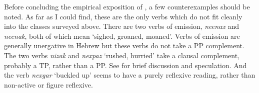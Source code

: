 \begin{exe}
\begin{xlist}
\begin{xlist}
\begin{exe}
\begin{xlist}
\begin{xlist}
\begin{exe}
\begin{xlist}
\begin{xlist}
\begin{exe}
\begin{exe}
\begin{xlist}
\begin{exe}
\begin{exe}
\begin{xlist}
\begin{exe}
\begin{exe}
\begin{exe}
\begin{exe}
\begin{exe}
\begin{xlist}
\begin{exe}
\begin{xlist}
\begin{exe}
\begin{exe}
\begin{xlist}
\begin{table}
	\caption{Readings for verbs in {\tnif}\label{tab:3-2:tnif}}
\end{table}

Before concluding the empirical exposition of {\tnif}, a few counterexamples should be noted. As far as I could find, these are the only verbs which do not fit cleanly into the classes surveyed above. There are two verbs of emission, \emph{neenax} and \emph{neenak}, both of which mean `sighed, groaned, moaned'. Verbs of emission are generally unergative in Hebrew \citep{siloni12,gafter14li} but these verbs do not take a PP complement. The two verbs \emph{nizak} and \emph{nexpaz} `rushed, hurried' take a clausal complement, probably a TP, rather than a PP. See \citet[126]{kastner16phd} for brief discussion and speculation. And the verb \emph{nexgar} `buckled up' seems to have a purely reflexive reading, rather than non-active or figure reflexive.\largerpage[-1]


\end{xlist}
\end{exe}
\end{exe}
\end{xlist}
\end{exe}
\end{xlist}
\end{exe}
\end{exe}
\end{exe}
\end{exe}
\end{exe}
\end{xlist}
\end{exe}
\end{exe}
\end{xlist}
\end{exe}
\end{exe}
\end{xlist}
\end{xlist}
\end{exe}
\end{xlist}
\end{xlist}
\end{exe}
\end{xlist}
\end{xlist}
\end{exe}
